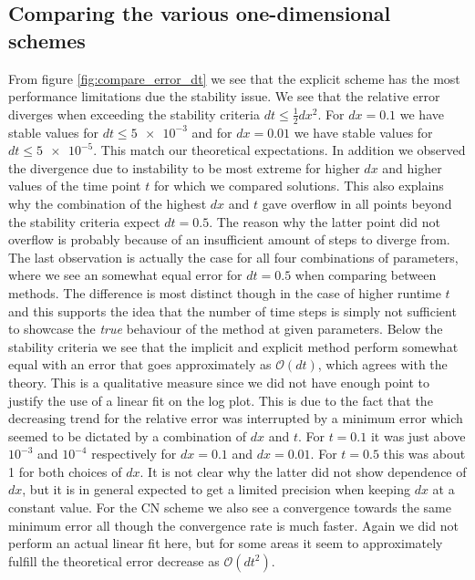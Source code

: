 \documentclass[%
 reprint,
nofootinbib,
aps,
]{revtex4-1}
\begin{document}
\subsection{Comparing the various one-dimensional schemes}
From figure \ref{fig:compare_error_dt} we see that the explicit scheme has the most performance limitations due the stability issue. We see that the relative error diverges when exceeding the stability criteria  $d t \leq \frac{1}{2} d x^2$. For $dx = 0.1$ we have stable values for $dt \leq \num{5e-3}$ and for $dx = 0.01$ we have stable values for $dt \leq  \num{5e-5}$. This match our theoretical expectations. In addition we observed the divergence due to instability to be most extreme for higher $dx$ and higher values of the time point $t$ for which we compared solutions. This also explains why the combination of the highest $dx$ and $t$ gave overflow in all points beyond the stability criteria expect $dt = 0.5$. The reason why the latter point did not overflow is probably because of an insufficient amount of steps to diverge from. The last observation is actually the case for all four combinations of parameters, where we see an somewhat equal error for $dt = 0.5$ when comparing between methods. The difference is most distinct though in the case of higher runtime $t$ and this supports the idea that the number of time steps is simply not sufficient to showcase the \textit{true} behaviour of the method at given parameters. Below the stability criteria we see that the implicit and explicit method perform somewhat equal with an error that goes approximately as $\mathcal{O}(dt)$, which agrees with the theory. This is a qualitative measure since we did not have enough point to justify the use of a linear fit on the log plot. This is due to the fact that the decreasing trend for the relative error was interrupted by a minimum error which seemed to be dictated by a combination of $dx$ and $t$. For $t = 0.1$ it was just above $10^{-3}$ and $10^{-4}$ respectively for $dx = 0.1$ and $dx = 0.01$. For $t = 0.5$ this was about 1 for both choices of $dx$. It is not clear why the latter did not show dependence of $dx$, but it is in general expected to get a limited precision when keeping $dx$ at a constant value. For the CN scheme we also see a convergence towards the same minimum error all though the convergence rate is much faster. Again we did not perform an actual linear fit here, but for some areas it seem to approximately fulfill the theoretical error decrease as $\mathcal{O}(d t^2)$.

\end{document}

